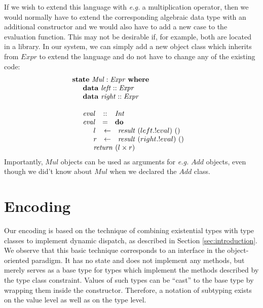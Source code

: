If we wish to extend this language with \emph{e.g.} a multiplication operator, then we would normally have to extend the corresponding algebraic data type with an additional constructor and we would also have to add a new case to the evaluation function. This may not be desirable if, for example, both are located in a library. In our system, we can simply add a new object class which inherits from $\mathit{Expr}$ to extend the language and do not have to change any of the existing code:
\begin{displaymath}
\begin{array}{l}
\mathbf{state}~\mathit{Mul} : \mathit{Expr}~\mathbf{where} \\
\quad \begin{array}{lcl}
\multicolumn{3}{l}{\mathbf{data}~\mathit{left}  :: \mathit{Expr}} \\
\multicolumn{3}{l}{\mathbf{data}~\mathit{right}  :: \mathit{Expr}} \\\\
\mathit{eval} & :: & \mathit{Int} \\
\mathit{eval} & = & \mathbf{do} \\
\multicolumn{3}{l}{\quad \begin{array}{lcl}
    l & \leftarrow & \mathit{result}~(left.!eval)~() \\
    r & \leftarrow & \mathit{result}~(right.!eval)~() \\
    \multicolumn{3}{l}{\mathit{return}~(l \times r)}
    \end{array}} 
\end{array}
\end{array}
\end{displaymath}
Importantly, $\mathit{Mul}$ objects can be used as arguments for \emph{e.g.} $\mathit{Add}$ objects, even though we did't know about $\mathit{Mul}$ when we declared the $\mathit{Add}$ class.

\section{Encoding}
\label{sec:encoding}

Our encoding is based on the technique of combining existential types with type classes to implement dynamic dispatch, as described in Section \ref{sec:introduction}. We observe that this basic technique corresponds to an interface in the object-oriented paradigm. It has no state and does not implement any methods, but merely serves as a base type for types which implement the methods described by the type class constraint. Values of such types can be ``cast'' to the base type by wrapping them inside the constructor. Therefore, a notation of subtyping exists on the value level as well as on the type level.

